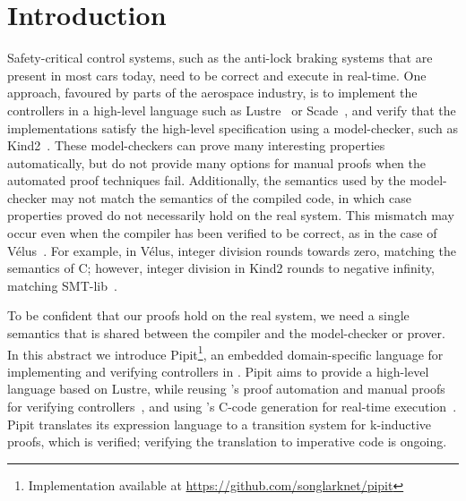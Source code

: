 \documentclass[sigplan,screen, review]{acmart}
\begin{document}



\maketitle

\makeatactive

\section{Introduction}
Safety-critical control systems, such as the anti-lock braking systems that are present in most cars today, need to be correct and execute in real-time.
One approach, favoured by parts of the aerospace industry, is to implement the controllers in a high-level language such as Lustre~\cite{caspi1995functional} or Scade~\cite{colaco2017scade}, and verify that the implementations satisfy the high-level specification using a model-checker, such as Kind2~\cite{champion2016kind2}.
These model-checkers can prove many interesting properties automatically, but do not provide many options for manual proofs when the automated proof techniques fail.
Additionally, the semantics used by the model-checker may not match the semantics of the compiled code, in which case properties proved do not necessarily hold on the real system.
This mismatch may occur even when the compiler has been verified to be correct, as in the case of Vélus~\cite{bourke2017formally}.
For example, in Vélus, integer division rounds towards zero, matching the semantics of C; however, integer division in Kind2 rounds to negative infinity, matching SMT-lib~\cite{BarFT2016SMTLIB,kind2023intdiv}.

To be confident that our proofs hold on the real system, we need a single semantics that is shared between the compiler and the model-checker or prover.
In this abstract we introduce Pipit\footnote{Implementation available at \url{https://github.com/songlarknet/pipit}}, an embedded domain-specific language for implementing and verifying controllers in \fstar{}.
Pipit aims to provide a high-level language based on Lustre, while reusing \fstar{}'s proof automation and manual proofs for verifying controllers~\cite{martinez2019meta}, and using \lowstar{}'s C-code generation for real-time execution~\cite{protzenko2017verified}.
Pipit translates its expression language to a transition system for k-inductive proofs, which is verified; verifying the translation to imperative code is ongoing.
\end{document}
